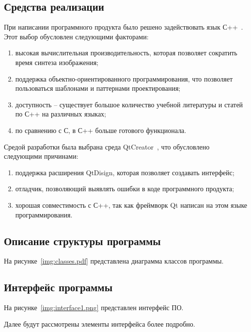 \subsection{Средства реализации}
При написании программного продукта было решено задействовать язык С++~\cite{cpp}. Этот выбор обусловлен следующими факторами:
\begin{enumerate}
	\item высокая вычислительная производительность, которая позволяет сократить время синтеза изображения;
	\item поддержка объектно-ориентированного программирования, что позволяет пользоваться шаблонами и паттернами проектирования;
	\item доступность – существует большое количество учебной литературы и статей по С++ на различных языках;
	\item по сравнению с С, в С++ больше готового функционала.
\end{enumerate}
Средой разработки была выбрана среда QtCreator~\cite{qt}, что обусловлено следующими причинами:
\begin{enumerate}
	\item поддержка расширения QtDisign, которая позволяет создавать интерфейс;
	\item отладчик, позволяющий выявлять ошибки в коде программного продукта;
	\item хорошая совместимость с С++, так как фреймворк Qt написан на этом языке программирования.
\end{enumerate}

\subsection{Описание структуры программы}
На рисунке~\ref{img:classes.pdf} представлена диаграмма классов программы.

\subsection{Интерфейс программы}
На рисунке~\ref{img:interface1.png} представлен интерфейс ПО. 

Далее будут рассмотрены элементы интерфейса более подробно.

